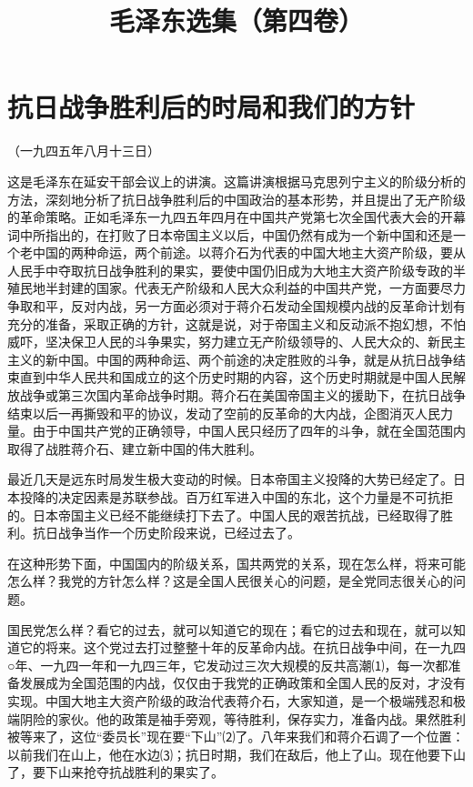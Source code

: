 \documentclass[UTF-8, a5paper, 12pt]{ctexart}
\title{毛泽东选集（第四卷）}
\begin{document}
    \maketitle
    \newpage
    \tableofcontents
    \newpage
    \section{抗日战争胜利后的时局和我们的方针}

    （一九四五年八月十三日）

    这是毛泽东在延安干部会议上的讲演。这篇讲演根据马克思列宁主义的阶级分析的方法，深刻地分析了抗日战争胜利后的中国政治的基本形势，并且提出了无产阶级的革命策略。正如毛泽东一九四五年四月在中国共产党第七次全国代表大会的开幕词中所指出的，在打败了日本帝国主义以后，中国仍然有成为一个新中国和还是一个老中国的两种命运，两个前途。以蒋介石为代表的中国大地主大资产阶级，要从人民手中夺取抗日战争胜利的果实，要使中国仍旧成为大地主大资产阶级专政的半殖民地半封建的国家。代表无产阶级和人民大众利益的中国共产党，一方面要尽力争取和平，反对内战，另一方面必须对于蒋介石发动全国规模内战的反革命计划有充分的准备，采取正确的方针，这就是说，对于帝国主义和反动派不抱幻想，不怕威吓，坚决保卫人民的斗争果实，努力建立无产阶级领导的、人民大众的、新民主主义的新中国。中国的两种命运、两个前途的决定胜败的斗争，就是从抗日战争结束直到中华人民共和国成立的这个历史时期的内容，这个历史时期就是中国人民解放战争或第三次国内革命战争时期。蒋介石在美国帝国主义的援助下，在抗日战争结束以后一再撕毁和平的协议，发动了空前的反革命的大内战，企图消灭人民力量。由于中国共产党的正确领导，中国人民只经历了四年的斗争，就在全国范围内取得了战胜蒋介石、建立新中国的伟大胜利。
    
    最近几天是远东时局发生极大变动的时候。日本帝国主义投降的大势已经定了。日本投降的决定因素是苏联参战。百万红军进入中国的东北，这个力量是不可抗拒的。日本帝国主义已经不能继续打下去了。中国人民的艰苦抗战，已经取得了胜利。抗日战争当作一个历史阶段来说，已经过去了。
    
    在这种形势下面，中国国内的阶级关系，国共两党的关系，现在怎么样，将来可能怎么样？我党的方针怎么样？这是全国人民很关心的问题，是全党同志很关心的问题。
    
    国民党怎么样？看它的过去，就可以知道它的现在；看它的过去和现在，就可以知道它的将来。这个党过去打过整整十年的反革命内战。在抗日战争中间，在一九四○年、一九四一年和一九四三年，它发动过三次大规模的反共高潮⑴，每一次都准备发展成为全国范围的内战，仅仅由于我党的正确政策和全国人民的反对，才没有实现。中国大地主大资产阶级的政治代表蒋介石，大家知道，是一个极端残忍和极端阴险的家伙。他的政策是袖手旁观，等待胜利，保存实力，准备内战。果然胜利被等来了，这位“委员长”现在要“下山”⑵了。八年来我们和蒋介石调了一个位置：以前我们在山上，他在水边⑶；抗日时期，我们在敌后，他上了山。现在他要下山了，要下山来抢夺抗战胜利的果实了。
    
\end{document}
